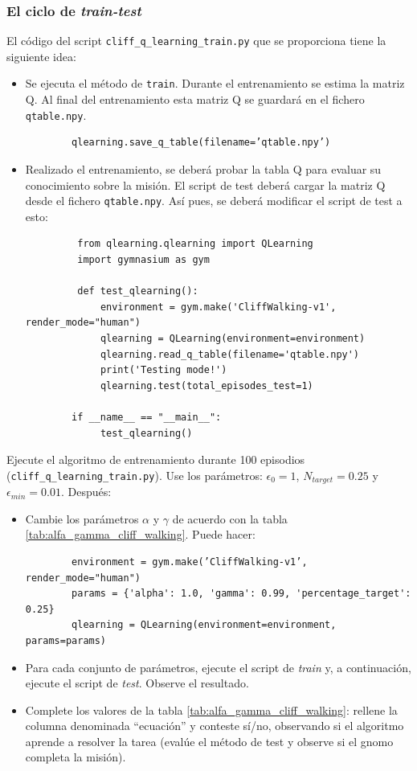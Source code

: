 \documentclass{article}
\begin{document}
\subsubsection{El ciclo de \textit{train-test}}
El código del script \texttt{cliff\_q\_learning\_train.py} que se proporciona tiene la siguiente idea:
\begin{itemize}
    \item Se ejecuta el método de \texttt{train}. Durante el entrenamiento se estima la matriz Q. Al final del entrenamiento esta matriz Q se guardará en el fichero \texttt{qtable.npy}. 
    \begin{verbatim}
        qlearning.save_q_table(filename=’qtable.npy’)
    \end{verbatim}
     \item Realizado el entrenamiento, se deberá probar la tabla Q para evaluar su conocimiento sobre la misión. El script de test deberá cargar la matriz Q desde el fichero \texttt{qtable.npy}. Así pues, se deberá modificar el script de test a esto:
     \begin{verbatim}
         from qlearning.qlearning import QLearning
         import gymnasium as gym

         def test_qlearning():
             environment = gym.make('CliffWalking-v1', render_mode="human")
             qlearning = QLearning(environment=environment)
             qlearning.read_q_table(filename='qtable.npy')
             print('Testing mode!')
             qlearning.test(total_episodes_test=1)

        if __name__ == "__main__":
             test_qlearning()
     \end{verbatim}
\end{itemize}

\begin{exercise}
\label{ej:alfa_gamma_cliff_walking}
Ejecute el algoritmo de entrenamiento durante 100 episodios (\texttt{cliff\_q\_learning\_train.py}). Use los parámetros: $\epsilon_0=1$, $N_{target}=0.25$ y $\epsilon_{min}=0.01$. Después:
\begin{itemize}
    \item Cambie los parámetros $\alpha$ y $\gamma$ de acuerdo con la tabla     \ref{tab:alfa_gamma_cliff_walking}. Puede hacer:
    \begin{verbatim}
        environment = gym.make(’CliffWalking-v1’, render_mode="human")
        params = {'alpha': 1.0, 'gamma': 0.99, 'percentage_target': 0.25}
        qlearning = QLearning(environment=environment, params=params)
    \end{verbatim}
    \item Para cada conjunto de parámetros, ejecute el script de \textit{train} y, a continuación, ejecute el script de \textit{test}. Observe el resultado.
    \item Complete los valores de la tabla \ref{tab:alfa_gamma_cliff_walking}: rellene la columna denominada ``ecuación'' y conteste sí/no, observando si el algoritmo aprende a resolver la tarea (evalúe el método de test y observe si el gnomo completa la misión).
\end{itemize}
\end{exercise}
\end{document}
